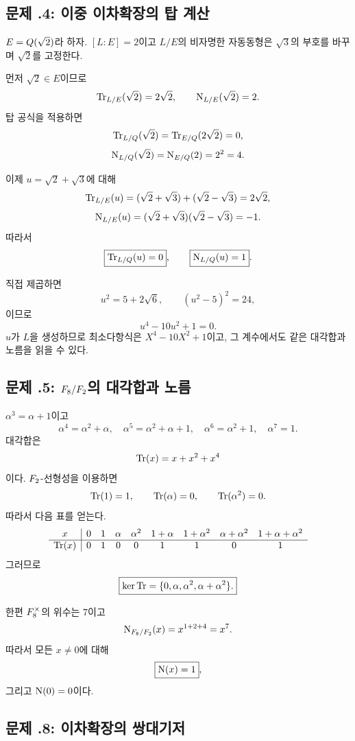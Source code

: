 \subsection*{문제 \thechapter.4: 이중 이차확장의 탑 계산}

\begin{solution}
$E=Q(\sqrt2)$라 하자. $[L:E]=2$이고 $L/E$의 비자명한 자동동형은
$\sqrt3$의 부호를 바꾸며 $\sqrt2$를 고정한다.

먼저 $\sqrt2\in E$이므로
\[
  \operatorname{Tr}_{L/E}(\sqrt2)=2\sqrt2,
  \qquad
  \operatorname{N}_{L/E}(\sqrt2)=2.
\]
탑 공식을 적용하면
\[
  \operatorname{Tr}_{L/Q}(\sqrt2)
  =\operatorname{Tr}_{E/Q}(2\sqrt2)=0,
\]
\[
  \operatorname{N}_{L/Q}(\sqrt2)
  =\operatorname{N}_{E/Q}(2)=2^2=4.
\]

이제 $u=\sqrt2+\sqrt3$에 대해
\[
  \operatorname{Tr}_{L/E}(u)
  =(\sqrt2+\sqrt3)+(\sqrt2-\sqrt3)
  =2\sqrt2,
\]
\[
  \operatorname{N}_{L/E}(u)
  =(\sqrt2+\sqrt3)(\sqrt2-\sqrt3)
  =-1.
\]
따라서
\[
  \boxed{\operatorname{Tr}_{L/Q}(u)=0},
  \qquad
  \boxed{\operatorname{N}_{L/Q}(u)=1}.
\]

직접 제곱하면
\[
  u^2=5+2\sqrt6,\qquad
  (u^2-5)^2=24,
\]
이므로
\[
  u^4-10u^2+1=0.
\]
$u$가 $L$을 생성하므로 최소다항식은 $X^4-10X^2+1$이고,
그 계수에서도 같은 대각합과 노름을 읽을 수 있다.
\end{solution}

\subsection*{문제 \thechapter.5: $F_8/F_2$의 대각합과 노름}

\begin{solution}
$\alpha^3=\alpha+1$이고
\[
  \alpha^4=\alpha^2+\alpha,\quad
  \alpha^5=\alpha^2+\alpha+1,\quad
  \alpha^6=\alpha^2+1,\quad
  \alpha^7=1.
\]
대각합은
\[
  \operatorname{Tr}(x)=x+x^2+x^4
\]
이다. $F_2$-선형성을 이용하면
\[
  \operatorname{Tr}(1)=1,\qquad
  \operatorname{Tr}(\alpha)=0,\qquad
  \operatorname{Tr}(\alpha^2)=0.
\]
따라서 다음 표를 얻는다.
\[
\begin{array}{c|cccccccc}
x&0&1&\alpha&\alpha^2&
1+\alpha&1+\alpha^2&
\alpha+\alpha^2&1+\alpha+\alpha^2\\
\hline
\operatorname{Tr}(x)&0&1&0&0&1&1&0&1
\end{array}
\]
그러므로
\[
  \boxed{
  \ker\operatorname{Tr}
  =\{0,\alpha,\alpha^2,\alpha+\alpha^2\}.}
\]

한편 $F_8^\times$의 위수는 $7$이고
\[
  \operatorname{N}_{F_8/F_2}(x)=x^{1+2+4}=x^7.
\]
따라서 모든 $x\ne0$에 대해
\[
  \boxed{\operatorname{N}(x)=1},
\]
그리고 $\operatorname{N}(0)=0$이다.
\end{solution}

\subsection*{문제 \thechapter.8: 이차확장의 쌍대기저}

